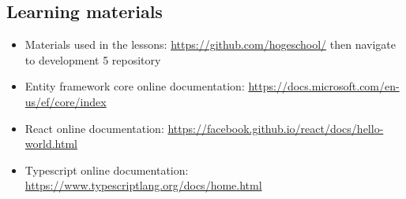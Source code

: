 \subsection{Learning materials}\label{learning-materials}
\begin{itemize}[nolistsep]
\item
  Materials used in the lessons:
  \url{https://github.com/hogeschool/} then navigate to development 5 repository
\item
  Entity framework core online documentation:
  \url{https://docs.microsoft.com/en-us/ef/core/index}
\item
  React online documentation:
  \url{https://facebook.github.io/react/docs/hello-world.html}
\item
  Typescript online documentation:
 \url{https://www.typescriptlang.org/docs/home.html}
\end{itemize}

